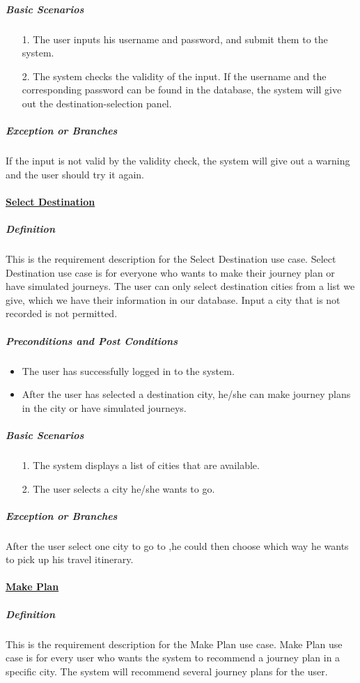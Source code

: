 \documentclass[10pt]{article}
\begin{document}
\begin{itemize}
		\subparagraph{Basic Scenarios} 
		\begin{itemize}
			\item[1.] The user inputs his username and password, and submit them to the system.
		
			\item[2.] The system checks the validity of the input. If the username and the corresponding password can be found in the database, the system will give out the destination-selection panel.
		\end{itemize}

		\subparagraph{Exception or Branches}
		If the input is not valid by the validity check, the system will give out a warning and the user should try it again.

		\paragraph{\underline{Select Destination}}
		\subparagraph{Definition} This is the requirement description for the Select Destination use case. Select Destination use case is for everyone who wants to make their journey plan or have simulated journeys. The user can only select destination cities from a list we give, which we have their information in our database. Input a city that is not recorded is not permitted.

		\subparagraph{Preconditions and Post Conditions}
		\begin{itemize}
			\item The user has successfully logged in to the system.
			\item After the user has selected a destination city, he/she can make journey plans in the city or have simulated journeys.
		\end{itemize}

		\subparagraph{Basic Scenarios}
		\begin{itemize}
			\item[1.] The system displays a list of cities that are available.
			\item[2.] The user selects a city he/she wants to go.
		\end{itemize}

		\subparagraph{Exception or Branches}
		After the user select one city to go to ,he could then choose which way he wants to pick up his travel itinerary.

		\paragraph{\underline{Make Plan}}
		\subparagraph{Definition}
		This is the requirement description for the Make Plan use case. Make Plan use case is for every user who wants the system to recommend a journey plan in a specific city. The system will recommend several journey plans for the user.


\end{itemize}
\end{document}

